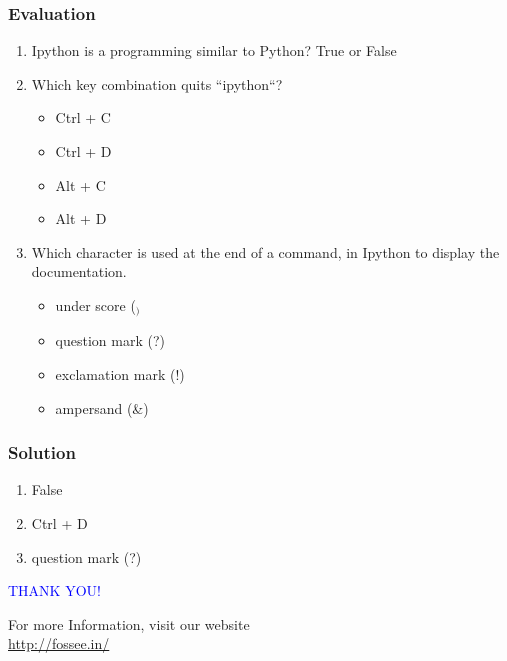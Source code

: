 \documentclass[presentation]{beamer}
\begin{document}
\begin{frame}
\frametitle{Evaluation}
\label{sec-10}


\begin{enumerate}
\item Ipython is a programming similar to Python?
     True or False
\item Which key combination quits ``ipython``?
\begin{itemize}
\item Ctrl + C
\item Ctrl + D
\item Alt + C
\item Alt + D
\end{itemize}
\item Which character is used at the end of a command, in Ipython to
     display the documentation.
\begin{itemize}
\item under score ($_)$
\item question mark (?)
\item exclamation mark (!)
\item ampersand (\&)
\end{itemize}
\end{enumerate}
\end{frame}
\begin{frame}
\frametitle{Solution}
\label{sec-11}


\begin{enumerate}
\item False
\item Ctrl + D
\item question mark (?)
\end{enumerate}
\end{frame}
\begin{frame}

  \begin{block}{}
  \begin{center}
  \textcolor{blue}{\Large THANK YOU!} 
  \end{center}
  \end{block}
\begin{block}{}
  \begin{center}
    For more Information, visit our website\\
    \url{http://fossee.in/}
  \end{center}  
  \end{block}
\end{frame}
\end{document}
